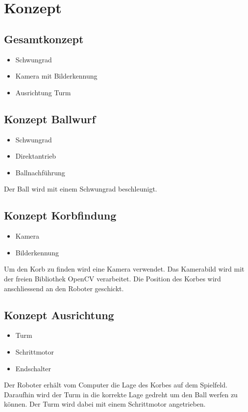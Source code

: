 \section{Konzept}

\subsection{Gesamtkonzept}
\begin{itemize}
    \item Schwungrad
    \item Kamera mit Bilderkennung
    \item Ausrichtung Turm
\end{itemize}

\subsection{Konzept Ballwurf}
\begin{itemize}
    \item Schwungrad
    \item Direktantrieb
    \item Ballnachführung
\end{itemize}
Der Ball wird mit einem Schwungrad beschleunigt. 

\subsection{Konzept Korbfindung}
\begin{itemize}
    \item Kamera
    \item Bilderkennung
\end{itemize}
Um den Korb zu finden wird eine Kamera verwendet. Das Kamerabild wird mit der 
freien Bibliothek OpenCV verarbeitet. Die Position des Korbes wird 
anschliessend an den Roboter geschickt. 

\subsection{Konzept Ausrichtung}
\begin{itemize}
    \item Turm
    \item Schrittmotor
    \item Endschalter
\end{itemize}
Der Roboter erhält vom Computer die Lage des Korbes auf dem Spielfeld. 
Daraufhin wird der Turm in die korrekte Lage gedreht um den Ball werfen zu 
können. Der Turm wird dabei mit einem Schrittmotor angetrieben. 

